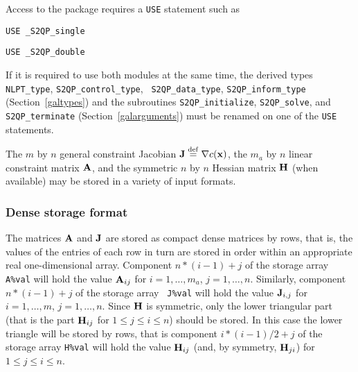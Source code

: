 \documentclass{galahad}
\newcommand{\packagename}{S2QP}
\newcommand{\fullpackagename}{\libraryname\_\packagename}
\newcommand{\Grad}{\nabla}
\begin{document}

\galhowto

Access to the package requires a {\tt USE} statement such as

\medskip{}

\hspace{8mm} {\tt USE \fullpackagename\_single}

\medskip{}

\hspace{8mm} {\tt USE  \fullpackagename\_double}

\medskip

If it is required to use both modules at the same time, the derived
types {\tt NLPT\_type}, {\tt S2QP\_control\_type}, {\tt
  S2QP\_data\_type}, {\tt S2QP\_inform\_type} (Section~\ref{galtypes})
and the subroutines {\tt S2QP\_initialize}, {\tt S2QP\_solve}, and
{\tt S2QP\_terminate} (Section~\ref{galarguments}) must be renamed on
one of the {\tt USE} statements.


\galmatrix The $m$ by $n$ general constraint Jacobian $\bmJ \eqdef
\Grad c(\bmx)$, the $m_a$ by $n$ linear constraint matrix ${\mathbf{A}}$, and
the symmetric $n$ by $n$ Hessian matrix ${\mathbf{H}}$ (when available) may
be stored in a variety of input formats.

\subsubsection{Dense storage format}\label{dense}
The matrices ${\mathbf{A}}$ and ${\mathbf{J}}$ are stored as compact dense matrices by
rows, that is, the values of the entries of each row in turn are
stored in order within an appropriate real one-dimensional array.
Component $n \ast (i-1) + j$ of the storage array {\tt A\%val} will
hold the value ${\mathbf{A}}_{ij}$ for $i = 1, \ldots , m_a$, $j = 1, \ldots ,
n$.  Similarly, component $n \ast (i-1) + j$ of the storage array {\tt
  J\%val} will hold the value ${\mathbf{J}}_{i,j}$ for $i = 1, \ldots , m$, $j =
1, \ldots , n$.  Since ${\mathbf{H}}$ is symmetric, only the lower triangular
part (that is the part ${\mathbf{H}}_{ij}$ for $1 \leq j \leq i \leq n$)
should be stored. In this case the lower triangle will be stored by rows, that is
component $i \ast (i-1)/2 + j$ of the storage array {\tt H\%val} will
hold the value ${\mathbf{H}}_{ij}$ (and, by symmetry, ${\mathbf{H}}_{ji}$) for $1 \leq j
\leq i \leq n$.
\end{document}
